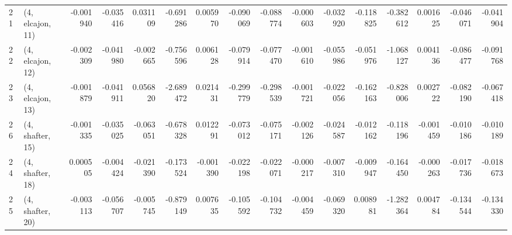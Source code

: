\begin{tabular}{llrrrrrrrrrrrrrr}
21 &  (4, elcajon, 11) &  -0.001940 & -0.035416 &  0.031109 &  -0.691286 &  0.005970 &  -0.090069 & -0.088774 & -0.000603 & -0.032920 & -0.118825 &  -0.382612 &  0.001625 & -0.046071 & -0.041904 \\
22 &  (4, elcajon, 12) &  -0.002309 & -0.041980 & -0.002665 &  -0.756596 &  0.006128 &  -0.079914 & -0.077470 & -0.001610 & -0.055986 & -0.051976 &  -1.068127 &  0.004136 & -0.086477 & -0.091768 \\
23 &  (4, elcajon, 13) &  -0.001879 & -0.041911 &  0.056820 &  -2.689472 &  0.021431 &  -0.299779 & -0.298539 & -0.001721 & -0.022056 & -0.162163 &  -0.828006 &  0.002722 & -0.082190 & -0.067418 \\
26 &  (4, shafter, 15) &  -0.001335 & -0.035025 & -0.063051 &  -0.678328 &  0.012291 &  -0.073012 & -0.075171 & -0.002126 & -0.024587 & -0.012162 &  -0.118196 & -0.001459 & -0.010186 & -0.010189 \\
24 &  (4, shafter, 18) &   0.000505 & -0.004424 & -0.021390 &  -0.173524 & -0.001390 &  -0.022198 & -0.022071 & -0.000217 & -0.007310 & -0.009947 &  -0.164450 & -0.000263 & -0.017736 & -0.018673 \\
25 &  (4, shafter, 20) &  -0.003113 & -0.056707 & -0.005745 &  -0.879149 &  0.007635 &  -0.105592 & -0.104732 & -0.004459 & -0.069320 &  0.008981 &  -1.282364 &  0.004784 & -0.134544 & -0.134330 \\
\bottomrule
\end{tabular}
